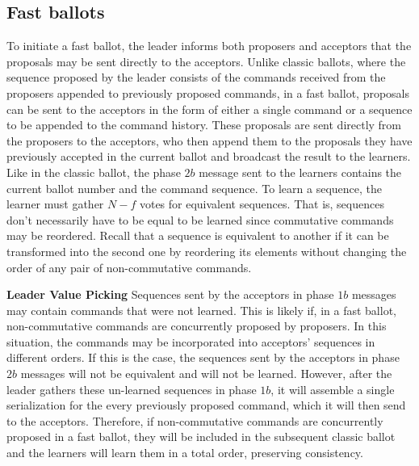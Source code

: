 \subsection{Fast ballots} 
To initiate a fast ballot, the leader informs both proposers and acceptors that the proposals may be sent directly to the acceptors. Unlike classic ballots, where the sequence proposed by the leader consists of the commands received from the proposers appended to previously proposed commands, in a fast ballot, proposals can be sent to the acceptors in the form of either a single command or a sequence to be appended to the command history. These proposals are sent directly from the proposers to the acceptors, who then append them to the proposals they have previously accepted in the current ballot and broadcast the result to the learners. Like in the classic ballot, the phase $2b$ message sent to the learners contains the current ballot number and the command sequence. To learn a sequence, the learner must gather $N-f$ votes for equivalent sequences. That is, sequences don't necessarily have to be equal to be learned since commutative commands may be reordered. Recall that a sequence is equivalent to another if it can be transformed into the second one by reordering its elements without changing the order of any pair of non-commutative commands. \par
\textbf{Leader Value Picking} Sequences sent by the acceptors in phase $1b$ messages may contain commands that were not learned. This is likely if, in a fast ballot, non-commutative commands are  concurrently proposed by proposers. In this situation, the commands may be incorporated into acceptors' sequences in different orders. If this is the case, the sequences sent by the acceptors in phase $2b$ messages will not be equivalent and will not be learned. However, after the leader gathers these un-learned sequences in phase $1b$, it will assemble a single serialization for the every previously proposed command, which it will then send to the acceptors. Therefore, if non-commutative commands are concurrently proposed in a fast ballot, they will be included in the subsequent classic ballot and the learners will learn them in a total order, preserving consistency.
